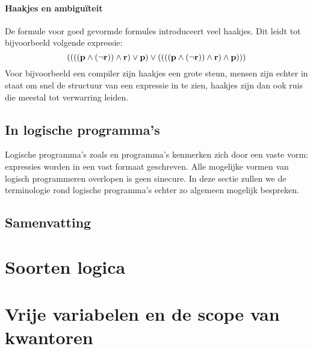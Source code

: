 \paragraph{Haakjes en ambigu\"iteit}
De formule voor goed gevormde formules introduceert veel haakjes. Dit leidt tot bijvoorbeeld volgende expressie:
\begin{equation}
\left( \left( \left( \left( \textbf{\ensuremath{\mbox{p}}}\wedge\left( \neg\textbf{\ensuremath{\mbox{r}}} \right) \right)\wedge\textbf{\ensuremath{\mbox{r}}} \right)\vee\textbf{\ensuremath{\mbox{p}}} \right)\vee\left( \left( \left( \left( \textbf{\ensuremath{\mbox{p}}}\wedge\left( \neg\textbf{\ensuremath{\mbox{r}}} \right) \right)\wedge\textbf{\ensuremath{\mbox{r}}} \right)\wedge\textbf{\ensuremath{\mbox{p}}} \right) \right) \right)
\end{equation}
Voor bijvoorbeeld een compiler zijn haakjes een grote steun, mensen zijn echter in staat om snel de structuur van een expressie in te zien, haakjes zijn dan ook ruis die meestal tot verwarring leiden.
\subsection{In logische programma's}
Logische programma's zoals \prolog{} en \problog{} programma's kenmerken zich door een vaste vorm: expressies worden in een vast formaat geschreven. Alle mogelijke vormen van logisch programmeren overlopen is geen sinecure. In deze sectie zullen we de terminologie rond logische programma's echter zo algemeen mogelijk bespreken.
\subsection{Samenvatting}
\section{Soorten logica}
\section{Vrije variabelen en de scope van kwantoren}